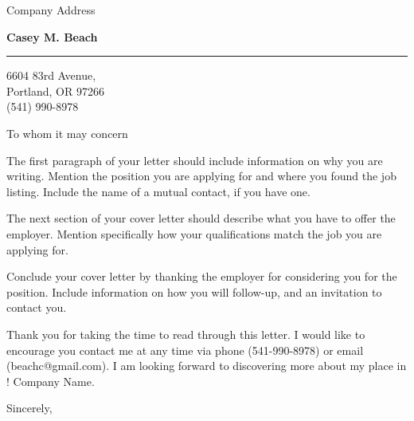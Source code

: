 \documentclass{letter} %
\begin{document}
\signature{Casey M. Beach}           %
\longindentation=0pt                       %
\let\raggedleft\raggedright                %
 
 
\begin{letter}{
    Company Address
}

\begin{center}
{\large\bf Casey M. Beach}
\end{center}
\medskip\hrule height 1pt
\begin{center}
6604 83rd Avenue,\\
Portland, OR 97266 \\
(541) 990-8978 
\end{center} 
\vspace{1in}

 
\opening{To whom it may concern} 
\begin{flushleft} 

\noindent The first paragraph of your letter should include information on why 
you are writing. Mention the position you are applying for and where you found 
the job listing. Include the name of a mutual contact, if you have one.

\noindent The next section of your cover letter should describe what you have 
to offer the employer. Mention specifically how your qualifications match the 
job you are applying for.

\noindent Conclude your cover letter by thanking the employer for considering 
you for the position. Include information on how you will follow-up, and an
invitation to contact you.

\noindent Thank you for taking the time to read through this letter. I would like to encourage you
contact me at any time via phone (541-990-8978) or email (beachc@gmail.com). I am looking forward to 
discovering more about my place in \ChangeThis! Company Name.



\end{flushleft}
\closing{Sincerely,} 
\vfill
\end{letter}
\end{document}
